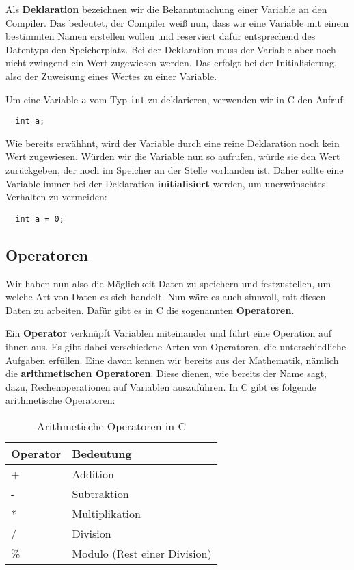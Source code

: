 \documentclass[11pt]{article}
\begin{document}
\begin{anmk}
  Als \textbf{Deklaration} bezeichnen wir die Bekanntmachung einer Variable an den Compiler. Das bedeutet, der Compiler
  weiß nun, dass wir eine Variable mit einem bestimmten Namen erstellen wollen und reserviert dafür entsprechend des
  Datentyps den Speicherplatz. Bei der Deklaration muss der Variable aber noch nicht zwingend ein Wert zugewiesen werden.
  Das erfolgt bei der Initialisierung, also der Zuweisung eines Wertes zu einer Variable.
\end{anmk}

\begin{bsp}
  Um eine Variable \texttt{a} vom Typ \texttt{int} zu deklarieren, verwenden wir in C den Aufruf:
  \begin{verbatim}
  int a;
  \end{verbatim}
\end{bsp}

Wie bereits erwähhnt, wird der Variable durch eine reine Deklaration noch kein Wert zugewiesen. Würden wir die Variable 
nun so aufrufen, würde sie den Wert zurückgeben, der noch im Speicher an der Stelle vorhanden ist. Daher sollte eine 
Variable immer bei der Deklaration \textbf{initialisiert} werden, um unerwünschtes Verhalten zu vermeiden:
\begin{verbatim}
  int a = 0;
\end{verbatim}

\subsection{Operatoren}
Wir haben nun also die Möglichkeit Daten zu speichern und festzustellen, um welche Art von Daten es sich handelt.
Nun wäre es auch sinnvoll, mit diesen Daten zu arbeiten. Dafür gibt es in C die sogenannten \textbf{Operatoren}.

Ein \textbf{Operator} verknüpft Variablen miteinander und führt eine Operation auf ihnen aus. Es gibt dabei verschiedene
Arten von Operatoren, die unterschiedliche Aufgaben erfüllen. Eine davon kennen wir bereits aus der Mathematik, nämlich
die \textbf{arithmetischen Operatoren}. Diese dienen, wie bereits der Name sagt, dazu, Rechenoperationen auf Variablen
auszuführen. In C gibt es folgende arithmetische Operatoren:

\begin{table}[h!]
  \centering
  \begin{tabular}{@{}ll@{}}
    \toprule
    Operator & Bedeutung                    \\ \midrule
    +        & Addition                     \\
    -        & Subtraktion                  \\
    *        & Multiplikation               \\
    /        & Division                     \\
    \%       & Modulo (Rest einer Division) \\ \bottomrule
  \end{tabular}
  \caption{Arithmetische Operatoren in C}
\end{table}
\end{document}
